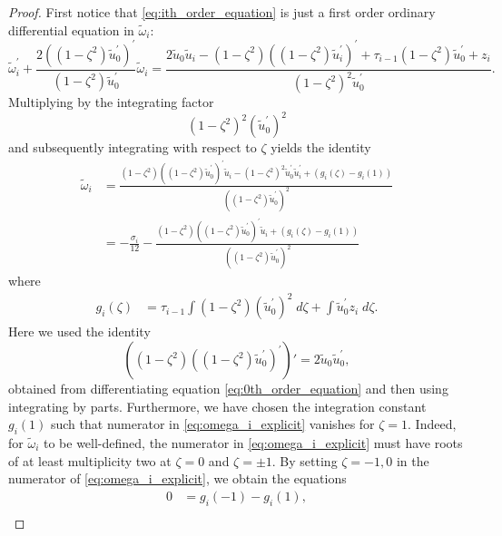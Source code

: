 \begin{proof}
First notice that \cref{eq:ith_order_equation} is just a first order ordinary
differential equation in $\tilde \omega_i$:
\begin{equation}
\label{eq:omegap_i_as_ode}
  \tilde\omega_i^{\prime} + \frac{2 \left( (1 - \zeta^2) \tilde u_0^\prime \right)^\prime}
				{(1 - \zeta^2) \tilde u_0^\prime} \tilde\omega_i
  = \frac{2 \tilde u_0\tilde u_i - (1-\zeta^2)\left((1-\zeta^2)\tilde u_i^\prime\right)^\prime
    + \tau_{i-1} \left(1- \zeta^2\right) \tilde u_0^\prime + z_i}
				{(1 - \zeta^2)^2 \tilde u_0^\prime}.
\end{equation}
Multiplying by the integrating factor 
\begin{equation}
    \label{eq:integrating_factor}
    (1-\zeta^2)^2\left( \tilde u_0^\prime \right)^2
\end{equation}
and subsequently integrating with respect to $\zeta$ yields the
identity
\begin{align}
  \tilde\omega_i  &=  \frac{ (1-\zeta^2)\left((1-\zeta^2)\tilde u_0^\prime\right)^\prime \tilde u_i 
      - (1-\zeta^2)^2\tilde u_0^\prime \tilde u_i^\prime + (g_i(\zeta)-g_i(1)) }
          { \left( \left(1 -\zeta^2\right) \tilde u_0^\prime \right)^2} \nonumber \\
        &=  -\frac{\sigma_i}{12} 
            - \frac{ (1-\zeta^2)\left((1-\zeta^2)\tilde u_0^\prime\right)^\prime \tilde u_i 
            + (g_i(\zeta)-g_i(1)) }
          { \left( \left(1 -\zeta^2\right) \tilde u_0^\prime \right)^2}
          \label{eq:omega_i_explicit}
\end{align}
where
\begin{align*}
  g_i(\zeta) &= \tau_{i-1} \int \left(1- \zeta^2\right) \left(
               \tilde u_0^\prime \right)^2 \; d\zeta + \int \tilde u_0^\prime z_i \; d\zeta.
\end{align*}
Here we used the identity 
\[
\left((1-\zeta^2)\left((1-\zeta^2)\tilde u_0^\prime\right)^\prime \right)' 
=2 \tilde u_0 \tilde u_0^\prime,
\]
obtained from differentiating equation \cref{eq:0th_order_equation} and then
using integrating by parts.  Furthermore, we have chosen the integration
constant $g_i(1)$ such that numerator in \cref{eq:omega_i_explicit} vanishes
for $\zeta=1$. Indeed, for $\tilde\omega_i$ to be well-defined, the numerator in
\cref{eq:omega_i_explicit} must have roots of at least multiplicity two at
$\zeta=0$ and $\zeta=\pm 1$. By setting $\zeta=-1,0$ in the numerator of
\cref{eq:omega_i_explicit}, we obtain the equations
\begin{align}
  0 & = g_i(-1) - g_i(1), \\

\end{align}
\end{proof}
